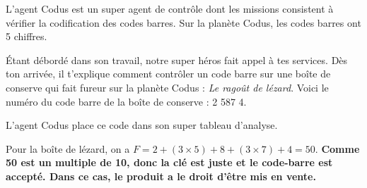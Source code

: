 L'agent Codus est un super agent de contrôle dont les missions
consistent à vérifier la codification des codes barres. Sur la planète
Codus, les codes barres ont 5 chiffres.
\par\'Etant débordé dans son travail, notre super héros fait appel à
tes services. Dès ton arrivée, il t'explique comment contrôler un code
barre sur une boîte de conserve qui fait fureur sur la planète Codus :
{\em Le ragoût de lézard}.
Voici le numéro du code barre de la boîte de conserve : 2 587 4.
\par L'agent Codus place ce code dans son super tableau d'analyse.
\par\vspace{2mm}\par{}
\par\vspace{2mm}\par
Pour la boîte de lézard, on a $F=2+(3\times5)+8+(3\times7)+4=50$. {\bf
  Comme 50 est un multiple de 10, donc la clé est juste et le
  code-barre est accepté. Dans ce cas, le produit a le droit d'être
  mis en vente.}
